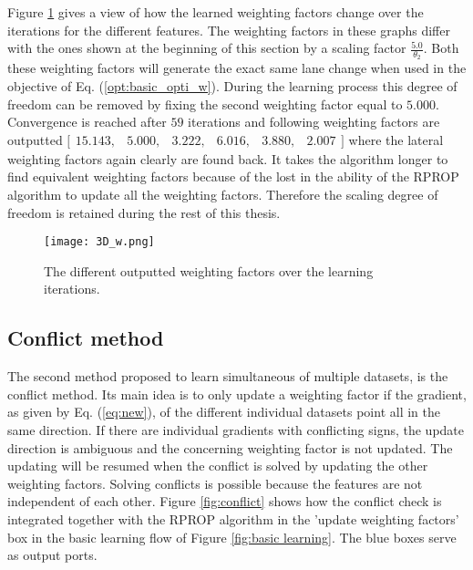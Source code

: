Figure \ref{fig:3D_w} gives a view of how the learned weighting factors change over the iterations for the different features. The weighting factors in these graphs differ with the ones shown at the beginning of this section by a scaling factor $\frac{5.0}{\theta_2}$. Both these weighting factors will generate the exact same lane change when used in the objective of Eq. (\ref{opt:basic_opti_w}). During the learning process this degree of freedom can be removed by fixing the second weighting factor equal to $5.000$. Convergence is reached after $59$ iterations and following weighting factors are outputted $\bigl[ \begin{smallmatrix} 15.143,&5.000,&3.222,&6.016,&3.880,&2.007\end{smallmatrix}\bigr]$ where the lateral weighting factors again clearly are found back. It takes the algorithm longer to find equivalent weighting factors because of the lost in the ability of the RPROP algorithm to update all the weighting factors. Therefore the scaling degree of freedom is retained during the rest of this thesis. \\

 
\begin{figure}[h!]
	\centering
	\texttt{[image: 3D\_w.png]}
	\caption{The different outputted weighting factors over the learning iterations.}
	\label{fig:3D_w}
\end{figure}

\subsection{Conflict method}\label{s:conflict_method}
 The second method proposed to learn simultaneous of multiple datasets, is the conflict method. Its main idea is to only update a weighting factor if the gradient, as given by Eq. (\ref{eq:new}), of the different individual datasets point all in the same direction. If there are individual gradients with conflicting signs, the update direction is ambiguous and the concerning weighting factor is not updated. The updating will be resumed when the conflict is solved by updating the other weighting factors. Solving conflicts is possible because the features are not independent of each other. Figure \ref{fig:conflict} shows how the conflict check is integrated together with the RPROP algorithm in the 'update weighting factors' box in the basic learning flow of Figure \ref{fig:basic learning}. The blue boxes serve as output ports.\\
 

